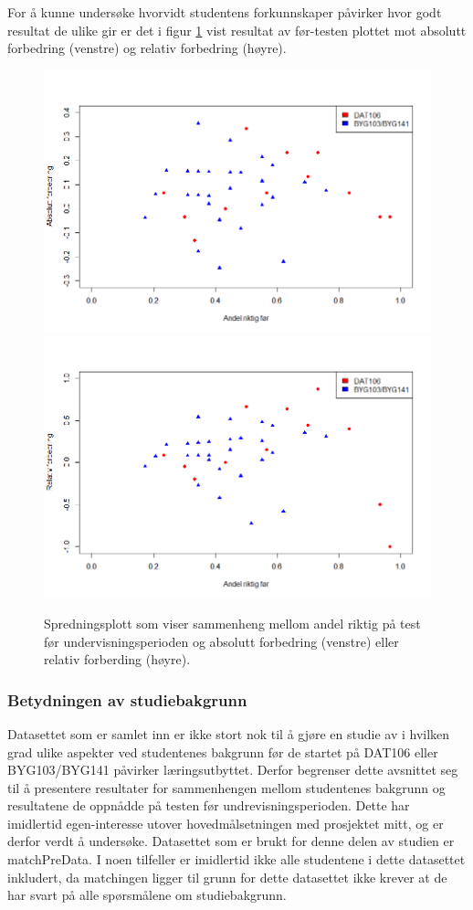 \documentclass[a4paper,norsk,12pt]{article}
\begin{document}
For å kunne undersøke hvorvidt studentens forkunnskaper påvirker hvor godt resultat de ulike gir er det i figur \ref{fig:scatter} vist resultat av før-testen plottet mot absolutt forbedring (venstre) og relativ forbedring (høyre). 
\begin{figure}[tp]
	\includegraphics[width=.48\textwidth]{./absoluttForbedringScatter}
	\includegraphics[width=.48\textwidth]{./relativForbedringScatter}
	\caption{Spredningsplott som viser sammenheng mellom andel riktig på test før undervisningsperioden og absolutt forbedring (venstre) eller relativ forberding (høyre).}
	\label{fig:scatter}
\end{figure}

\subsubsection{Betydningen av studiebakgrunn}
Datasettet som er samlet inn er ikke stort nok til å gjøre en studie av i hvilken grad ulike aspekter ved studentenes bakgrunn før de startet på DAT106 eller BYG103/BYG141 påvirker læringsutbyttet. Derfor begrenser dette avsnittet seg til å presentere resultater for sammenhengen mellom studentenes bakgrunn og resultatene de oppnådde på testen før undrevisningsperioden. Dette har imidlertid egen-interesse utover hovedmålsetningen med prosjektet mitt, og er derfor verdt å undersøke. Datasettet som er brukt for denne delen av studien er matchPreData. I noen tilfeller er imidlertid ikke alle studentene i dette datasettet inkludert, da matchingen ligger til grunn for dette datasettet ikke krever at de har svart på alle spørsmålene om studiebakgrunn.
\end{document}
